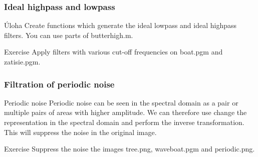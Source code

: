 \documentclass{beamer}
\begin{document}
\begin{frame}
\frametitle{Ideal highpass and lowpass}
  \begin{block}{Úloha}
  Create functions which generate the ideal lowpass and ideal highpass filters. You can use parts of butterhigh.m.
  \end{block}
  
  \begin{block}{Exercise}
  Apply filters with various cut-off frequencies on boat.pgm and zatisie.pgm.
  \end{block}
\end{frame}

\begin{frame}
\frametitle{Filtration of periodic noise}
  \begin{block}{Periodic noise}
  Periodic noise can be seen in the spectral domain as a pair or multiple pairs of areas with higher amplitude. We can therefore use change the representation in the spectral domain and perform the inverse transformation. This will suppress the noise in the original image.
  \end{block}
  
  \begin{block}{Exercise}
  Suppress the noise the images tree.png, waveboat.pgm and periodic.png.
  \end{block}
\end{frame}
\end{document}
